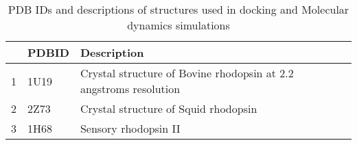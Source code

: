 \begin{table}[tbp]
\centering
\begin{tabular}{rll}
  \hline
\hline
 & PDBID & Description \\ 
  \hline
1 & 1U19 & Crystal structure of Bovine rhodopsin at 2.2 angstroms resolution \\ 
  2 & 2Z73 & Crystal structure of Squid rhodopsin \\ 
  3 & 1H68 & Sensory rhodopsin II \\ 
   \hline
\hline
\end{tabular}
\caption[PDB IDs and descriptions of structures used in comparative analyses]{PDB IDs and descriptions of structures used in docking and Molecular dynamics simulations} 
\label{tab:AppData_PDB}
\end{table}
